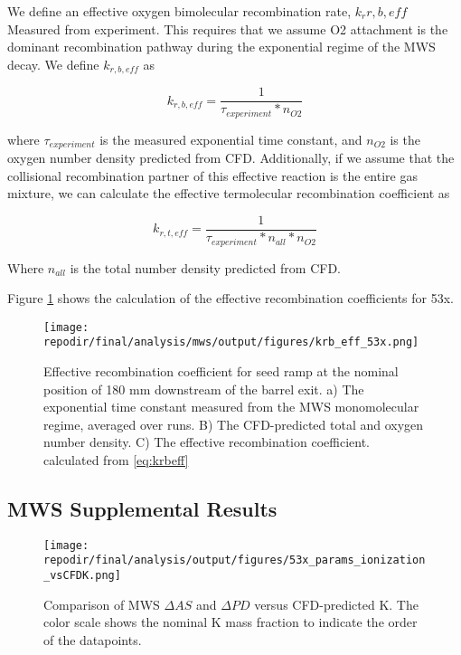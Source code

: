 \clearpage

We define an effective oxygen bimolecular recombination rate, $k_r{r, b,eff}$ Measured from experiment. This requires that we assume O2 attachment is the dominant recombination pathway during the exponential regime of the MWS decay. We define $k_{r,b,eff}$ as 

\begin{equation}
    \label{eq:krbeff}
    k_{r,b,eff} = \frac{1}{\tau_{experiment} *  n_{O2}}
\end{equation}

where $\tau_{experiment}$ is the measured exponential time constant,  and $n_{O2}$ is the oxygen number density predicted from CFD. Additionally, if we assume that the collisional recombination partner of this effective reaction is the entire gas mixture, we can calculate the effective termolecular recombination coefficient as


\begin{equation}
    \label{eq:krteff}
    k_{r,t,eff} = \frac{1}{\tau_{experiment} * n_{all} *  n_{O2}}
\end{equation}

Where $n_{all}$ is the total number density predicted from CFD.

Figure \ref{fig:SI_krb_eff_53x} shows the calculation of the effective recombination coefficients for 53x.

\begin{figure}[]
\centering
\texttt{[image: \\repodir/final/analysis/mws/output/figures/krb\_eff\_53x.png]}
\caption{Effective recombination coefficient for seed ramp at the nominal position of 180 mm downstream of the barrel exit. a) The exponential time constant measured from the MWS monomolecular regime, averaged over runs. B) The CFD-predicted total and oxygen number density. C) The effective recombination coefficient. calculated from \ref{eq:krbeff}}
\label{fig:SI_krb_eff_53x}
\end{figure}

\subsection{MWS Supplemental Results}

\begin{figure}[h]
    \centering
    \texttt{[image: \\repodir/final/analysis/output/figures/53x\_params\_ionization\_vsCFDK.png]} 
    \caption{Comparison of MWS $\Delta AS$ and $\Delta PD$ versus CFD-predicted K. The color scale shows the nominal K mass fraction to indicate the order of the datapoints.}
    \label{fig:SI_53x_params_ionization_vsCFDK}
\end{figure}

